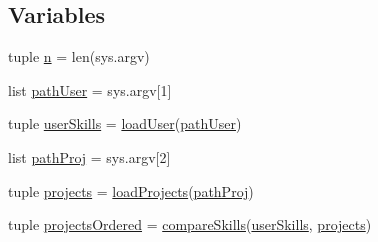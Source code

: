 \subsection*{Variables}
\begin{DoxyCompactItemize}
\item 
tuple \hyperlink{namespacestudents_1_1matchmaking_a10ddf73615b34b61e24d9570a53eadf8}{n} = len(sys.\-argv)
\item 
list \hyperlink{namespacestudents_1_1matchmaking_a3d4ffe9845e7326e75ef529734ac9e91}{path\-User} = sys.\-argv\mbox{[}1\mbox{]}
\item 
tuple \hyperlink{namespacestudents_1_1matchmaking_a53165c9d3c68ba55847f8301028564e3}{user\-Skills} = \hyperlink{namespacestudents_1_1matchmaking_aa36aaf3aef1354180f31305846591946}{load\-User}(\hyperlink{namespacestudents_1_1matchmaking_a3d4ffe9845e7326e75ef529734ac9e91}{path\-User})
\item 
list \hyperlink{namespacestudents_1_1matchmaking_a96ec4d725826c01b8e22d6115967008b}{path\-Proj} = sys.\-argv\mbox{[}2\mbox{]}
\item 
tuple \hyperlink{namespacestudents_1_1matchmaking_a64150aeb721ef104b626012eacefded6}{projects} = \hyperlink{namespacestudents_1_1matchmaking_a856d112aa07868c6024c35cd0a90c24c}{load\-Projects}(\hyperlink{namespacestudents_1_1matchmaking_a96ec4d725826c01b8e22d6115967008b}{path\-Proj})
\item 
tuple \hyperlink{namespacestudents_1_1matchmaking_ad6b6e78ce4d795b130413ee857e4ee91}{projects\-Ordered} = \hyperlink{namespacestudents_1_1matchmaking_aa3c57417f509579aa72e905cc90bac71}{compare\-Skills}(\hyperlink{namespacestudents_1_1matchmaking_a53165c9d3c68ba55847f8301028564e3}{user\-Skills}, \hyperlink{namespacestudents_1_1matchmaking_a64150aeb721ef104b626012eacefded6}{projects})
\end{DoxyCompactItemize}


